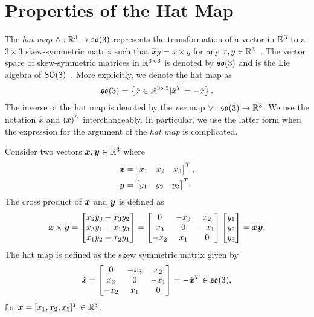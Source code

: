 
\chapter{Properties of the Hat Map}


The \textit{hat map} $\wedge :\mathbb{R}^{3}\rightarrow\mathfrak{so}(3)$ represents the transformation of a vector in $\mathbb{R}^{3}$ to a $3\times 3$ skew-symmetric matrix such that $\hat x y = x\times y$ for any $x,y\in\mathbb{R}^{3}$~\cite{bullo2004}. 
The vector space of skew-symmetric matrices in \( \mathbb{R}^{3 \times 3 } \) is denoted by \( \mathfrak{so}(3) \) and is the Lie algebra of \( \mathsf{SO(3)} \)~\cite{hall2015}.
More explicitly, we denote the hat map as
\begin{align*}
    \mathfrak{so}(3) = \left\{  \hat x \in \mathbb{R}^{3 \times 3} | \hat x^T = - \hat x  \right\}.
\end{align*}
The inverse of the hat map is denoted by the \textit{vee} map $\vee:\mathfrak{so}(3)\rightarrow\mathbb{R}^{3}$. 
We use the notation \( \hat{x}\) and \( \left( x \right)^\wedge\) interchangeably.
In particular, we use the latter form when the expression for the argument of the \textit{hat map} is complicated. 

Consider two vectors \( \bm{x}, \bm{y} \in \mathbb{R}^3\) where
\begin{align*}
    \bm{x} &= \begin{bmatrix} x_1 & x_2 & x_3 \end{bmatrix}^T , \\
    \bm{y} &= \begin{bmatrix} y_1 & y_2 & y_3 \end{bmatrix}^T .
\end{align*}
The cross product of \( \bm{x} \) and \( \bm{y} \) is defined as
\begin{align}
    \bm{x} \times \bm{y} = 
    \begin{bmatrix} 
        x_2 y_3 - x_3 y_2 \\
        x_3 y_1 - x_1 y_3 \\
        x_1 y_2 - x_2 y_1 
    \end{bmatrix}
    = 
    \begin{bmatrix} 0 & -x_3 & x_2 \\ x_3 & 0 & -x_1 \\ -x_2 & x_1 & 0\end{bmatrix}
    \begin{bmatrix} y_1 \\ y_2 \\ y_3 \end{bmatrix}
    = \hat{\bm{x}} \bm{y}.
\end{align}
The hat map is defined as the skew symmetric matrix given by
\begin{align}
    \hat x = \begin{bmatrix} 0 & -x_3 & x_2 \\ x_3 & 0 & -x_1 \\ -x_2 & x_1 & 0\end{bmatrix} 
    = - \hat{\bm{x}}^T \in \mathfrak{so}(3) ,
\end{align}
for $\bm{x}=[x_1,x_2,x_3]^T\in\mathbb{R}^{3}$. 

